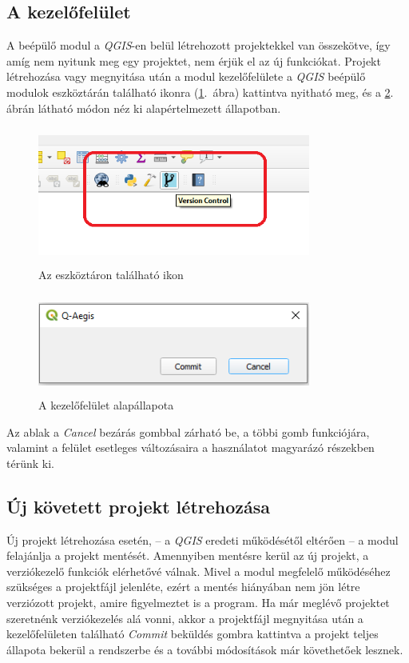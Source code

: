 \subsection{A kezelőfelület}
A beépülő modul a \emph{QGIS}-en belül létrehozott projektekkel van összekötve, így amíg nem nyitunk meg egy projektet, nem érjük el az új funkciókat. Projekt létrehozása vagy megnyitása után a modul kezelőfelülete a \emph{QGIS} beépülő modulok eszköztárán található ikonra (\ref{fig:picture-2}.~ábra) kattintva nyitható meg, és a \ref{fig:picture-3}. ábrán látható módon néz ki alapértelmezett állapotban.
\begin{figure}[H]
	\centering
	\includegraphics[width=0.8\textwidth,height=170px]{images/plugin_button_new.png}
	\caption{Az eszköztáron található ikon}
	\label{fig:picture-2}
\end{figure}
\begin{figure}[H]
	\centering
	\includegraphics[width=0.8\textwidth,height=125px]{images/norepo_state_new.png}
	\caption{A kezelőfelület alapállapota}
	\label{fig:picture-3}
\end{figure}
Az ablak a \emph{Cancel} bezárás gombbal zárható be, a többi gomb funkciójára, valamint a felület esetleges változásaira a használatot magyarázó részekben térünk ki.
\subsection{Új követett projekt létrehozása}
Új projekt létrehozása esetén, -- a \emph{QGIS} eredeti működésétől eltérően -- a modul felajánlja a projekt mentését. Amennyiben mentésre kerül az új projekt, a verziókezelő funkciók elérhetővé válnak. Mivel a modul megfelelő működéséhez szükséges a projektfájl jelenléte, ezért a mentés hiányában nem jön létre verziózott projekt, amire figyelmeztet is a program.
Ha már meglévő projektet szeretnénk verziókezelés alá vonni, akkor a projektfájl megnyitása után a kezelőfelületen található \emph{Commit} beküldés gombra kattintva a projekt teljes állapota bekerül a rendszerbe és a további módosítások már követhetőek lesznek.


